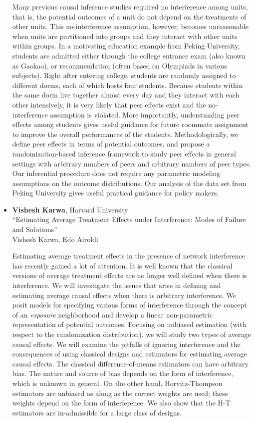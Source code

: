 \begin{itemize}
Many previous causal inference studies required no interference among units, that is, the potential outcomes of a unit do not depend on the treatments of other units. This no-interference assumption, however, becomes unreasonable when units are partitioned into groups and they interact with other units  within groups. In a motivating education example from Peking University, students are admitted either through the college entrance exam (also known as Gaokao), or recommendation (often based on Olympiads in various subjects). Right after entering college, students are randomly assigned to different dorms, each of which hosts four students. Because students within the same dorm live together almost every day and they interact with each other intensively, it is very likely that peer effects exist and the no-interference assumption is violated. More importantly, understanding peer effects among students gives useful guidance for future roommate assignment to improve the overall performances of the students. Methodologically, we define peer effects in terms of potential outcomes, and propose a randomization-based inference framework to study peer effects in general settings with arbitrary numbers of peers and arbitrary numbers of peer types. Our inferential procedure does not require any parametric modeling assumptions on the outcome distributions. Our analysis of the data set from Peking University gives useful practical guidance for policy makers.

\item \textbf{Vishesh Karwa}, Harvard University \\
``Estimating Average Treatment Effects under Interference: Modes of Failure and Solutions'' \\
Vishesh Karwa, Edo Airoldi


Estimating average treatment effects in the presence of network interference has recently gained a lot of attention. It is well known that the classical versions of average treatment effects are no longer well defined when there is interference. We will investigate the issues that arise in defining and estimating average causal effects when there is arbitrary interference. We posit models for specifying various forms of interference through the concept of an \emph{exposure} neighborhood and develop a linear non-parametric representation of potential outcomes. Focusing on unbiased estimation (with respect to the randomization distribution), we will study two types of average causal effects. We will examine the pitfalls of ignoring interference and the consequences of using classical designs and estimators for estimating average causal effects. The classical difference-of-means estimators can have arbitrary bias. The nature and source of bias depends on the form of interference, which is unknown in general. On the other hand, Horvitz-Thompson estimators are unbiased as along as the correct weights are used; these weights depend on the form of interference. We also show that the H-T estimators are in-admissible for a large class of designs.

\end{itemize}

